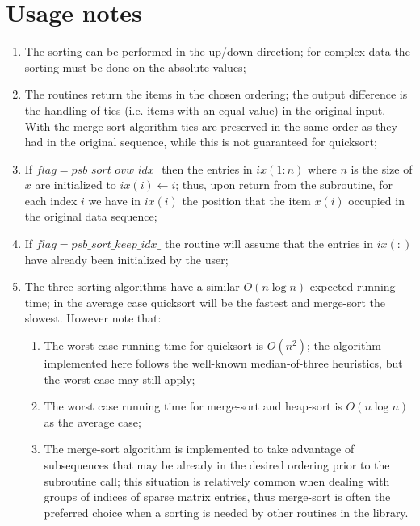 \section*{Usage notes}
\begin{enumerate}
\item The sorting can be performed in the up/down direction; for
  complex data the sorting must be done on the absolute values;
\item The routines return the items in the chosen ordering; the
  output difference is the handling of  ties (i.e. items with an
  equal   value) in the original input. With the merge-sort algorithm
  ties are   preserved in the same order as they had in the original
  sequence,  while this is not guaranteed for quicksort;
\item If $flag = psb\_sort\_ovw\_idx\_$ then the entries in $ix(1:n)$
  where $n$ is the size of $x$ are initialized to $ix(i) \leftarrow
  i$; thus, upon return from the subroutine, for each
  index $i$ we have in $ix(i)$ the position that the item $x(i)$
  occupied in the original data sequence;
\item If $flag = psb\_sort\_keep\_idx\_$  the routine will assume that
  the entries in $ix(:)$ have already been initialized by the user;
\item The three sorting algorithms have a similar $O(n \log n)$ expected
  running time; in the average case quicksort will be the
  fastest and merge-sort the slowest. However note that:
\begin{enumerate}
\item The worst case running time for quicksort is $O(n^2)$; the algorithm
  implemented here follows the well-known median-of-three heuristics,
  but the worst case may still apply;
\item The worst case running time for merge-sort and heap-sort is
  $O(n\log n)$  as the average case;
\item The merge-sort algorithm is implemented to take advantage of 
  subsequences that may be already in the desired ordering prior to
  the subroutine call; this situation is relatively common when
  dealing with groups of indices of sparse matrix entries, thus
  merge-sort is often the preferred  choice when a sorting is needed
  by other routines in the library. 
\end{enumerate}
\end{enumerate}



